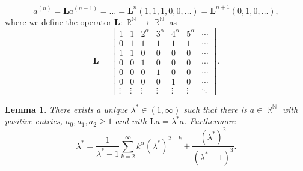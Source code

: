 \documentclass[a4paper, 11pt]{article}
\DeclareMathOperator{\N}{\mathbb{N}}
\DeclareMathOperator{\R}{\mathbb{R}}
\numberwithin{equation}{section}
\theoremstyle{plain}
\newtheorem{lemma}[theorem]{Lemma}
\theoremstyle{remark}
\theoremstyle{definition}
\begin{document}
\begin{equation*}
a^{(n)} = \mathbf{L}a^{(n-1)}= \dots = \mathbf{L}^n(1,1,1,0,0,\dots) = \mathbf{L}^{n+1}(0,1,0,\dots),
\end{equation*}
where we define the operator $\mathbf{L}: \R^{\N} \to \R^{\N}$ as
\begin{equation*}
\mathbf{L} = \begin{bmatrix}
1 & 1 & 2^\alpha & 3^\alpha & 4^\alpha & 5^\alpha & \cdots \\
0 & 1 & 1 & 1 & 1 & 1 & \cdots \\
1 & 1 & 0 & 0 & 0 & 0 & \cdots \\
0 & 0 & 1 & 0 & 0 & 0 & \cdots \\
0 & 0 & 0 & 1 & 0 & 0 & \cdots \\
0 & 0 & 0 & 0 & 1 & 0 & \cdots \\
\vdots & \vdots & \vdots & \vdots & \vdots & \vdots & \ddots
\end{bmatrix}.
\end{equation*}

\begin{lemma}\label{ex2lemma1}
There exists a unique $\lambda^*\in(1,\infty)$ such that there is $a \in \R^{\N}$ with positive entries, $a_0,a_1,a_2 \geq 1$ and with $\mathbf{L}a = \lambda^*a$. Furthermore
\begin{equation*}
\lambda^* = \frac{1}{\lambda^*-1}\sum_{k=2}^\infty k^\alpha (\lambda^*)^{2-k} + \frac{(\lambda^*)^2}{(\lambda^*-1)^3}.
\end{equation*}
\end{lemma}
\end{document}
